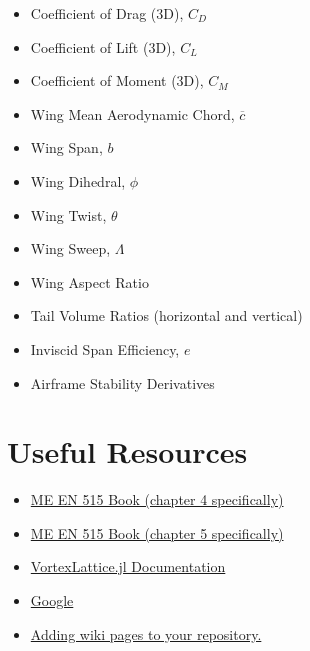 \documentclass[12pt]{article}
\begin{document}
\begin{multicols}{2}
	\begin{itemize}
		\item Coefficient of Drag (3D), $C_D$
		\item Coefficient of Lift (3D), $C_L$
		\item Coefficient of Moment (3D), $C_M$
		\item Wing Mean Aerodynamic Chord, $\overline{c}$
		\item Wing Span, $b$
		\item Wing Dihedral, $\phi$
		\item Wing Twist, $\theta$
		\item Wing Sweep, $\Lambda$
		\item Wing Aspect Ratio
		\item Tail Volume Ratios (horizontal and vertical)
		\item Inviscid Span Efficiency, $e$
		\item Airframe Stability Derivatives
	\end{itemize}
\end{multicols}




\section{Useful Resources}

\begin{itemize}
	\item \href{https://byu.box.com/shared/static/ywfayozbj3sr2ot6b32u8nqk5brqvurt.pdf}{ME EN 515 Book (chapter 4 specifically)}
	\item \href{http://flowlab.groups.et.byu.net/me415/flight.pdf}{ME EN 515 Book (chapter 5 specifically)}
	\item \href{https://flow.byu.edu/VortexLattice.jl/stable/}{VortexLattice.jl Documentation}
	\item \href{https://letmegooglethat.com/?q=what+is+the+vertical+tail+volume+ratio+formula}{Google}
	\item \href{https://docs.github.com/en/communities/documenting-your-project-with-wikis/adding-or-editing-wiki-pages}{Adding wiki pages to your repository.}
\end{itemize}
\end{document}
